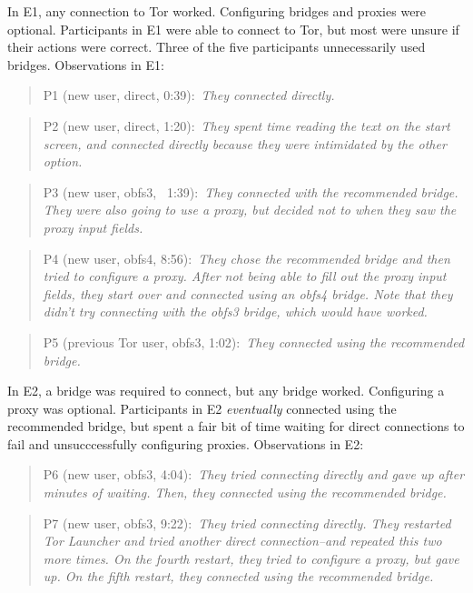 \documentclass[USenglish,oneside,twocolumn]{article}
\newcommand{\pquote}[2]{
\begin{quotation}
\noindent #1:~\textit{#2}
\end{quotation}
}
\begin{document}


In E1, any connection to Tor worked. Configuring bridges and proxies were optional.  
Participants in E1 were able to connect to Tor, but most were unsure if their actions were correct. Three of the five participants unnecessarily used bridges. 
Observations in E1: 

\pquote{P1 (new user, direct, 0:39)}{They connected directly.}

\pquote{P2 (new user, direct, 1:20)}{They spent time reading the text on the start screen, and connected directly because they were intimidated by the other option.}

\pquote{P3 (new user, obfs3, ~1:39)}{They connected with the recommended bridge. They were also going to use a proxy, but decided not to when they saw the proxy input fields.}

\pquote{P4 (new user, obfs4, 8:56)}{They chose the recommended bridge and then tried to configure a proxy. After not being able to fill out the proxy input fields, they start over and connected using an obfs4 bridge. Note that they didn't try connecting with the obfs3 bridge, which would have worked.}

\pquote{P5 (previous Tor user, obfs3, 1:02)}{They connected using the recommended bridge.}

In E2, a bridge was required to connect, but any bridge worked. Configuring a proxy was optional.
Participants in E2 {\it eventually} connected using the recommended bridge, but spent a fair bit of time waiting for direct connections to fail and unsucccessfully configuring proxies. 
Observations in E2: 

\pquote{P6 (new user, obfs3, 4:04)}{They tried connecting directly and gave up after minutes of waiting. Then, they connected using the recommended bridge.}

\pquote{P7 (new user, obfs3, 9:22)}{They tried connecting directly. They restarted Tor Launcher and tried another direct connection--and repeated this two more times. On the fourth restart, they tried to configure a proxy, but gave up. On the fifth restart, they connected using the recommended bridge.}
\end{document}
